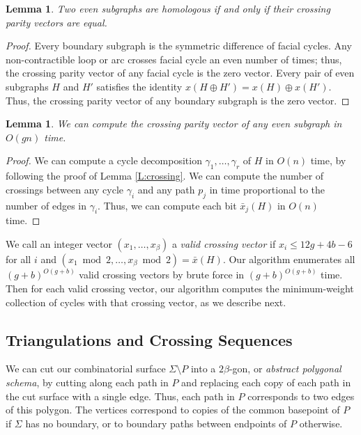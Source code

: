 \documentclass{sig-alternate}
\newtheorem{lemma}[theorem]{Lemma}
\begin{document}
\begin{lemma}
Two even subgraphs are homologous if and only if their crossing parity vectors are equal.
\end{lemma}

\begin{proof}
Every boundary subgraph is the symmetric difference of facial cycles.  Any non-contractible loop or arc crosses facial cycle an even number of times; thus, the crossing parity vector of any facial cycle is the zero vector.  Every pair of even subgraphs $H$ and $H'$ satisfies the identity $x(H\oplus H') = x(H) \oplus x(H')$.  Thus, the crossing parity vector of any boundary subgraph is the zero vector.
\end{proof}

\begin{lemma}
We can compute the crossing parity vector of any even subgraph in $O(gn)$ time.
\end{lemma}

\begin{proof}
We can compute a cycle decomposition $\gamma_1, \dots, \gamma_r$ of $H$ in $O(n)$ time, by following the proof of Lemma \ref{L:crossing}.  We can compute the number of crossings between any cycle $\gamma_i$ and any path $p_j$ in time proportional to the number of edges in $\gamma_i$.  Thus, we can compute each bit $\bar{x}_j(H)$ in $O(n)$ time.
\end{proof}

We call an integer vector $(x_1, \dots, x_\beta)$ a \emph{valid
crossing vector} if $x_i \le 12g+4b-6$ for all $i$ and $({x_1\bmod
2}, \dots,\allowbreak {x_\beta\bmod 2}) = \bar{x}(H)$.  Our
algorithm enumerates all $(g+b)^{O(g+b)}$ valid crossing vectors by
brute force in ${(g+b)}^{O(g+b)}$ time.  Then for each valid
crossing vector, our algorithm computes the minimum-weight
collection of cycles with that crossing vector, as we describe next.

\subsection{Triangulations and Crossing Sequences}

We can cut our combinatorial surface $\Sigma\setminus P$ into a $2\beta$-gon, or \emph{abstract polygonal schema}, by cutting along each path in $P$ and replacing each copy of each path in the cut surface with a single edge.  Thus, each path in $P$ corresponds to two edges of this polygon. The vertices correspond to copies of the common basepoint of $P$ if $\Sigma$ has no boundary, or to boundary paths between endpoints of $P$ otherwise.
\end{document}
